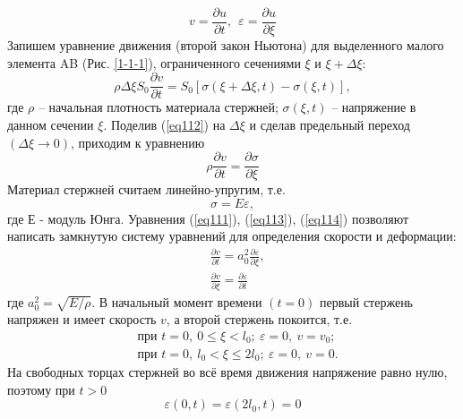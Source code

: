 \documentclass[specialist, subf, href, colorlinks=true, 14pt, final]{disser}
\theoremstyle{definition}
\newcommand{\pdfrac}[2]{\frac{\partial #1}{\partial #2}}
\begin{document}
\begin{equation}\label{eq111}
  v = \frac{\partial u}{\partial t},\ \ \varepsilon = \frac{\partial u}{\partial \xi}
\end{equation}
Запишем уравнение движения (второй закон Ньютона) для 
выделенного малого элемента AB (Рис. \ref{1-1-1}), ограниченного сечениями $\xi$ и $\xi + \Delta\xi$:
\begin{equation}\label{eq112}
  \rho\Delta\xi S_{0} \frac{\partial v}{\partial t} = S_{0} \left[\sigma(\xi+\Delta\xi, t) - \sigma(\xi, t)\right],
\end{equation}
где $\rho$ -- начальная плотность материала стержней; $\sigma(\xi,t)$ -- напряжение в данном сечении $\xi$. 
Поделив (\ref{eq112}) на $\Delta\xi$ и сделав предельный переход $(\Delta\xi \rightarrow 0)$, приходим к уравнению
\begin{equation}\label{eq113}
  \rho\frac{\partial v}{\partial t} = \frac{\partial \sigma}{\partial \xi}
\end{equation}
Материал стержней считаем линейно-упругим, т.е.
\begin{equation}\label{eq114}
  \sigma = E\varepsilon,
\end{equation}
где $Е$ - модуль Юнга. 
Уравнения (\ref{eq111}), (\ref{eq113}), (\ref{eq114}) позволяют написать замкнутую систему уравнений для определения скорости и деформации:
\begin{equation}\label{eq115}
  \begin{aligned}
  &\pdfrac{v}{t} = a_{0}^{2} \pdfrac{\varepsilon}{\xi},\\ 
  &\pdfrac{v}{\xi} = \pdfrac{\varepsilon}{t}
  \end{aligned}
\end{equation}
где $a_{0}^{2} = \sqrt{E/\rho}$.
В начальный момент времени $(t = 0)$ первый стержень 
напряжен и имеет скорость $v$, а второй стержень покоится, т.е.
\begin{equation}\label{eq116}
  \begin{aligned}
  &\text{при } t = 0,\ 0 \leqslant \xi < l_{0};\ \varepsilon = 0,\ v = v_{0};\\ 
  &\text{при } t = 0,\ l_{0} < \xi \leqslant 2l_{0};\ \varepsilon = 0,\ v = 0.
  \end{aligned}
\end{equation}
На свободных торцах стержней во всё время движения напряжение равно нулю, поэтому при $t > 0$
\begin{equation}\label{eq117}
  \varepsilon(0, t) = \varepsilon(2l_{0}, t) = 0
\end{equation}
\end{document}
